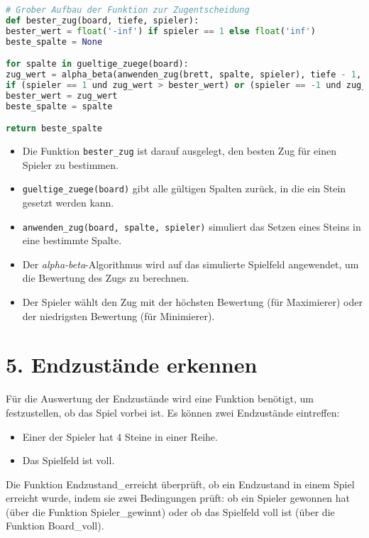 \begin{lstlisting}[language=Python, caption=Entscheidung für den besten Zug - Überblick]
# Grober Aufbau der Funktion zur Zugentscheidung
def bester_zug(board, tiefe, spieler):
bester_wert = float('-inf') if spieler == 1 else float('inf')
beste_spalte = None

for spalte in gueltige_zuege(board):
zug_wert = alpha_beta(anwenden_zug(brett, spalte, spieler), tiefe - 1, -float('inf'), float('inf'), False)
if (spieler == 1 und zug_wert > bester_wert) or (spieler == -1 und zug_wert < bester_wert):
bester_wert = zug_wert
beste_spalte = spalte

return beste_spalte
\end{lstlisting}
\begin{itemize}

	\item Die Funktion \texttt{bester\_zug} ist darauf ausgelegt, den besten Zug für einen Spieler zu bestimmen. 
	\item \texttt{gueltige\_zuege(board)} gibt alle gültigen Spalten zurück, in die ein Stein gesetzt werden kann. 
	\item \texttt{anwenden\_zug(board, spalte, spieler)} simuliert das Setzen eines Steins in eine bestimmte Spalte. 
	\item Der \emph{alpha-beta}-Algorithmus wird auf das simulierte Spielfeld angewendet, um die Bewertung des Zugs zu berechnen. 
	\item Der Spieler wählt den Zug mit der höchsten Bewertung (für Maximierer) oder der niedrigsten Bewertung (für Minimierer).
\end{itemize}

\section*{5. Endzustände erkennen}

Für die Auswertung der Endzustände wird eine Funktion benötigt, um festzustellen, ob das Spiel vorbei ist. Es können zwei Endzustände eintreffen:
\begin{itemize}
	\item Einer der Spieler hat 4 Steine in einer Reihe.
	\item Das Spielfeld ist voll.
\end{itemize}

Die Funktion Endzustand\_erreicht überprüft, ob ein Endzustand in einem Spiel erreicht wurde, indem sie zwei Bedingungen prüft: ob ein Spieler gewonnen hat (über die Funktion Spieler\_gewinnt) oder ob das Spielfeld voll ist (über die Funktion Board\_voll). 

